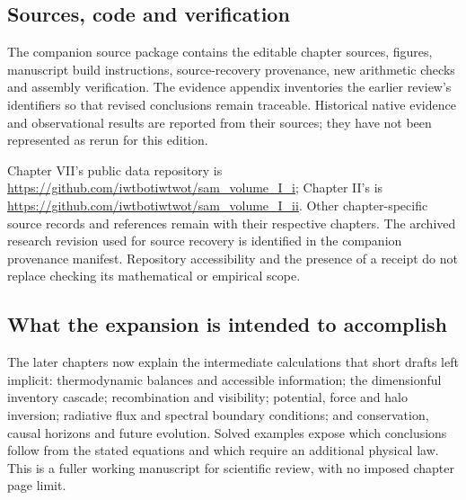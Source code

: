 \subsection*{Sources, code and verification}
The companion source package contains the editable chapter sources, figures, manuscript build instructions, source-recovery provenance, new arithmetic checks and assembly verification. The evidence appendix inventories the earlier review's identifiers so that revised conclusions remain traceable. Historical native evidence and observational results are reported from their sources; they have not been represented as rerun for this edition.

Chapter VII's public data repository is \url{https://github.com/iwtbotiwtwot/sam_volume_I_i}; Chapter II's is \url{https://github.com/iwtbotiwtwot/sam_volume_I_ii}. Other chapter-specific source records and references remain with their respective chapters. The archived research revision used for source recovery is identified in the companion provenance manifest. Repository accessibility and the presence of a receipt do not replace checking its mathematical or empirical scope.

\subsection*{What the expansion is intended to accomplish}
The later chapters now explain the intermediate calculations that short drafts left implicit: thermodynamic balances and accessible information; the dimensionful inventory cascade; recombination and visibility; potential, force and halo inversion; radiative flux and spectral boundary conditions; and conservation, causal horizons and future evolution. Solved examples expose which conclusions follow from the stated equations and which require an additional physical law. This is a fuller working manuscript for scientific review, with no imposed chapter page limit.

